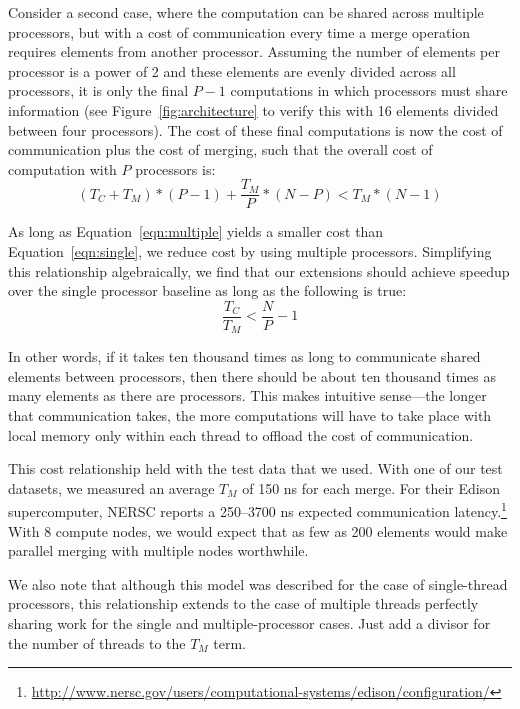 \documentclass[10pt]{article}
\begin{document}
Consider a second case, where the computation can be shared across multiple processors, but with
a cost of communication every time a merge operation requires elements from another processor.
Assuming the number of elements per processor is a power of 2 and these elements are evenly 
divided across all processors, it is only the final $P - 1$ computations in which processors
must share information (see Figure~\ref{fig:architecture} to verify this with 16 elements
divided between four processors).
The cost of these final computations is now the cost of communication plus the cost of merging,
such that the overall cost of computation with $P$ processors is:
\begin{equation}\label{eqn:multiple}
\left( T_C + T_M \right) *(P-1)+\frac{T_M}{P}*(N-P)<T_M*(N-1)
\end{equation}

As long as Equation~\ref{eqn:multiple} yields a smaller cost than Equation~\ref{eqn:single}, we
reduce cost by using multiple processors.
Simplifying this relationship algebraically, we find that our extensions should achieve speedup
over the single processor baseline as long as the following is true:
\begin{equation}
\frac{T_C}{T_M} < \frac{N}{P} - 1
\end{equation}

In other words, if it takes ten thousand times as long to communicate shared elements between
processors, then there should be about ten thousand times as many elements as there are
processors.
This makes intuitive sense---the longer that communication takes, the more computations will
have to take place with local memory only within each thread to offload the cost of communication.

This cost relationship held with the test data that we used.
With one of our test datasets, we measured an average $T_M$ of 150 ns for each merge.
For their Edison supercomputer, NERSC reports a 250--3700 ns expected communication 
latency.\footnote{\url{http://www.nersc.gov/users/computational-systems/edison/configuration/}}
With 8 compute nodes, we would expect that as few as 200 elements would make parallel merging
with multiple nodes worthwhile.

We also note that although this model was described for the case of single-thread processors,
this relationship extends to the case of multiple threads perfectly sharing work for the single and
multiple-processor cases.
Just add a divisor for the number of threads to the $T_M$ term.
\end{document}
